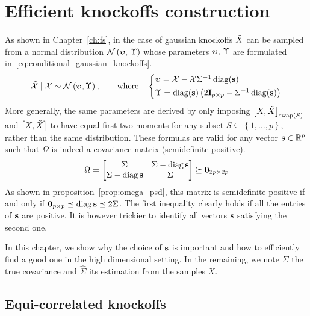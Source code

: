 \chapter{Efficient knockoffs construction}\label{ch:sdp}

As shown in Chapter~\ref{ch:fs}, in the case of gaussian knockoffs
$\tilde{X}$ can be sampled from a normal distribution $\mathcal{N}\left( \bm{\upsilon},\, \Upsilon \right)$ whose parameters
$\bm{\upsilon},\, \Upsilon$ are formulated in~\ref{eq:conditional_gaussian_knockoffs}.
\begin{equation}\label{eq:conditional_gaussian_knockoffs}
    \tcX \mid \cX \sim \cN\left( \bupsilon, \Upsilon \right)
    ,\qquad\text{where}\quad
    \begin{cases*}
        \bupsilon = \cX - \cX\Sigma^{-1}\diag(\bs)\\
        \Upsilon = \diag(\bs)\left( 2\mI_{p \times p} - \Sigma^{-1}\diag(\bs) \right)
    \end{cases*}
\end{equation}
More generally, the same parameters are derived by only imposing
$\big[ X, \tilde{X} \big]_{\operatorname{swap}\left( S \right)}$ and $\big[ X, \tilde{X} \big]$
to have equal first two moments
for any subset
$S \subseteq \left\{ 1, \dots, p \right\}$,
rather than the same distribution.
These formulas are valid for any vector $\mathbf{s} \in \mathbb{R}^p$ such that $\Omega$
is indeed a covariance matrix (semidefinite positive).
\begin{equation*}
    \Omega = \begin{bmatrix}
        \Sigma & \Sigma - \operatorname*{diag} \mathbf{s}\\
        \Sigma - \operatorname*{diag} \mathbf{s} & \Sigma
    \end{bmatrix}
    \succeq \mathbf{0}_{2p \times 2p}
\end{equation*}
As shown in proposition~\ref{prop:omega_psd},
this matrix is semidefinite positive if and only if $\mathbf{0}_{p \times p} \preceq \operatorname*{diag} \mathbf{s} \preceq 2 \Sigma$.
The first inequality clearly holds if all the entries of $\mathbf{s}$ are positive.
It is however trickier to identify all vectors $\mathbf{s}$ satisfying the second one.

In this chapter, we show why the choice of $\mathbf{s}$ is important and how to efficiently find a good one
in the high dimensional setting.
In the remaining, we note $\Sigma$ the true covariance and $\hat{\Sigma}$ its estimation from the samples $X$.

\section{Equi-correlated knockoffs}\label{sec:equi}

